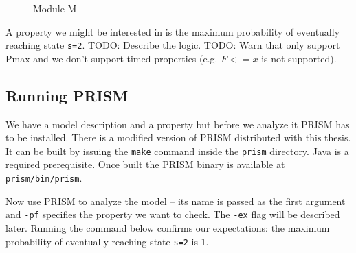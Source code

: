 \begin{figure}
\caption{Module M}
\label{moduleM}
\end{figure}

A property we might be interested in is the maximum probability of
eventually reaching state \verb|s=2|.  TODO: Describe the logic.
TODO: Warn that only support Pmax and we don't support timed properties (e.g. $F <=
x$ is not supported).

\subsection*{Running PRISM}

We have a model description and a property but before we analyze it
PRISM has to be installed.
There is a modified version of PRISM distributed with this thesis. It
can be built by issuing the \verb|make| command inside the
\verb|prism| directory. Java is a required prerequisite.
Once built the PRISM binary is available at \verb|prism/bin/prism|.

Now use PRISM to analyze the model -- its name is passed as the first
argument and \verb|-pf| specifies the property we want to check.
The \verb|-ex| flag will be described later.
Running the command below
confirms our expectations: the maximum probability of eventually
reaching state \verb|s=2| is 1.

